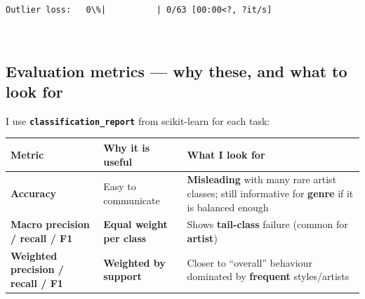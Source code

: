\documentclass[11pt]{article}
\begin{document}
    
    \begin{Verbatim}[commandchars=\\\{\}]
Outlier loss:   0\%|          | 0/63 [00:00<?, ?it/s]
    \end{Verbatim}

    
    \begin{center}
    \end{center}
    { \hspace*{\fill} \\}
    
    \subsection{Evaluation metrics --- why these, and what to look
for}\label{evaluation-metrics-why-these-and-what-to-look-for}

I use \textbf{\texttt{classification\_report}} from scikit-learn for
each task:

{\def\LTcaptype{none} %
\begin{longtable}[]{@{}
  >{\raggedright\arraybackslash}p{}
  >{\raggedright\arraybackslash}p{}
  >{\raggedright\arraybackslash}p{}@{}}
\toprule\noalign{}
\begin{minipage}[b]{\linewidth}\raggedright
Metric
\end{minipage} & \begin{minipage}[b]{\linewidth}\raggedright
Why it is useful
\end{minipage} & \begin{minipage}[b]{\linewidth}\raggedright
What I look for
\end{minipage} \\
\midrule\noalign{}
\endhead
\bottomrule\noalign{}
\endlastfoot
\textbf{Accuracy} & Easy to communicate & \textbf{Misleading} with many
rare artist classes; still informative for \textbf{genre} if it is
balanced enough \\
\textbf{Macro precision / recall / F1} & \textbf{Equal weight per class}
& Shows \textbf{tail-class} failure (common for \textbf{artist}) \\
\textbf{Weighted precision / recall / F1} & \textbf{Weighted by support}
& Closer to ``overall'' behaviour dominated by \textbf{frequent}
styles/artists \\
\end{longtable}
}
\end{document}

